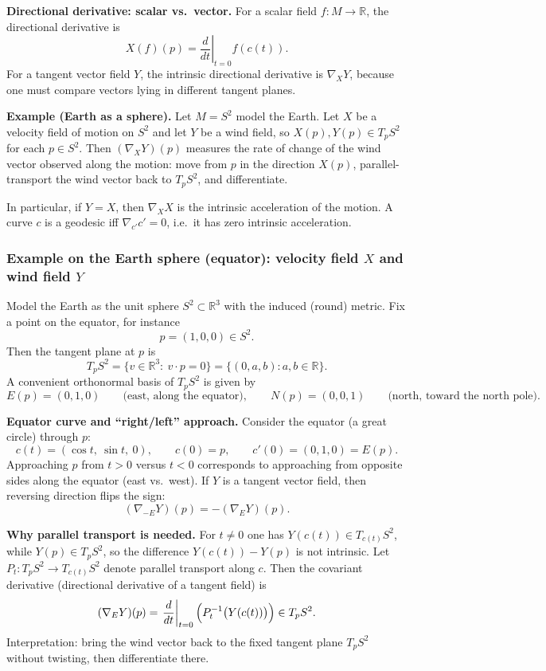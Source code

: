 \documentclass[12pt,a4paper]{article}
\theoremstyle{plain}
\theoremstyle{definition}      %
\begin{document}
\medskip
\textbf{Directional derivative: scalar vs.\ vector.}
For a scalar field $f:M\to\mathbb{R}$, the directional derivative is
\[
X(f)(p)=\left.\frac{d}{dt}\right|_{t=0} f(c(t)).
\]
For a tangent vector field $Y$, the intrinsic directional derivative is $\nabla_X Y$,
because one must compare vectors lying in different tangent planes.

\medskip
\textbf{Example (Earth as a sphere).}
Let $M=S^2$ model the Earth.
Let $X$ be a velocity field of motion on $S^2$ and let $Y$ be a wind field,
so $X(p),Y(p)\in T_pS^2$ for each $p\in S^2$.
Then $(\nabla_X Y)(p)$ measures the rate of change of the wind vector observed along the motion:
move from $p$ in the direction $X(p)$, parallel-transport the wind vector back to $T_pS^2$,
and differentiate.

In particular, if $Y=X$, then $\nabla_X X$ is the intrinsic acceleration of the motion.
A curve $c$ is a geodesic iff $\nabla_{c'}c'=0$, i.e.\ it has zero intrinsic acceleration.

\subsubsection*{Example on the Earth sphere (equator): velocity field $X$ and wind field $Y$}

Model the Earth as the unit sphere $S^2\subset\mathbb{R}^3$ with the induced (round) metric.
Fix a point on the equator, for instance
\[
p=(1,0,0)\in S^2.
\]
Then the tangent plane at $p$ is
\[
T_pS^2=\{v\in\mathbb{R}^3:\ v\cdot p=0\}=\{(0,a,b):a,b\in\mathbb{R}\}.
\]
A convenient orthonormal basis of $T_pS^2$ is given by
\[
E(p)=(0,1,0)\qquad\text{(east, along the equator)},\qquad
N(p)=(0,0,1)\qquad\text{(north, toward the north pole)}.
\]

\medskip
\textbf{Equator curve and ``right/left'' approach.}
Consider the equator (a great circle) through $p$:
\[
c(t)=(\cos t,\ \sin t,\ 0),\qquad c(0)=p,\qquad c'(0)=(0,1,0)=E(p).
\]
Approaching $p$ from $t>0$ versus $t<0$ corresponds to approaching from opposite sides along the
equator (east vs.\ west). If $Y$ is a tangent vector field, then reversing direction flips the sign:
\[
(\nabla_{-E}Y)(p)=-(\nabla_EY)(p).
\]

\medskip
\textbf{Why parallel transport is needed.}
For $t\neq 0$ one has $Y(c(t))\in T_{c(t)}S^2$, while $Y(p)\in T_pS^2$, so the difference
$Y(c(t))-Y(p)$ is not intrinsic. Let $P_t:T_pS^2\to T_{c(t)}S^2$ denote parallel transport along $c$.
Then the covariant derivative (directional derivative of a tangent field) is
\[
(\nabla_{E}Y)(p)
=\left.\frac{d}{dt}\right|_{t=0}\Bigl(P_t^{-1}\bigl(Y(c(t))\bigr)\Bigr)\in T_pS^2.
\]
Interpretation: bring the wind vector back to the fixed tangent plane $T_pS^2$ without twisting,
then differentiate there.
\end{document}
